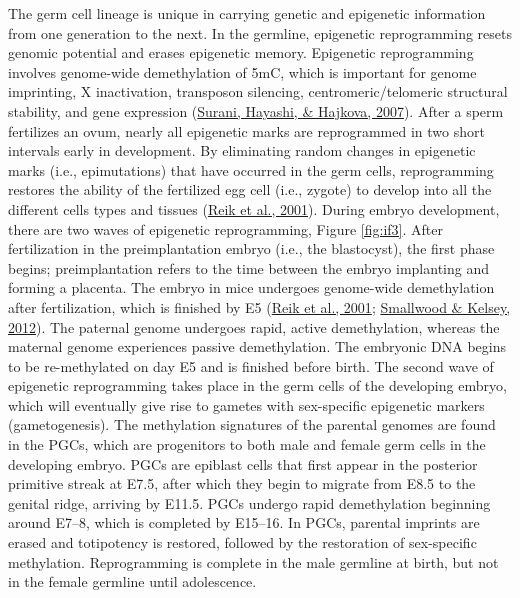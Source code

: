 \documentclass[12pt,twoside]{reedthesis}
\begin{document}
The germ cell lineage is unique in carrying genetic and epigenetic
information from one generation to the next. In the germline, epigenetic
reprogramming resets genomic potential and erases epigenetic memory.
Epigenetic reprogramming involves genome-wide demethylation of 5mC,
which is important for genome imprinting, X inactivation, transposon
silencing, centromeric/telomeric structural stability, and gene
expression (\protect\hyperlink{ref-surani2007}{Surani, Hayashi, \& Hajkova, 2007}). After a sperm fertilizes an ovum, nearly all
epigenetic marks are reprogrammed in two short intervals early in
development. By eliminating random changes in epigenetic marks (i.e.,
epimutations) that have occurred in the germ cells, reprogramming restores the ability
of the fertilized egg cell (i.e., zygote) to develop into all the
different cells types and tissues (\protect\hyperlink{ref-reik2001}{Reik et al., 2001}). During embryo
development, there are two waves of epigenetic reprogramming, Figure \ref{fig:if3}.
After fertilization in the preimplantation embryo (i.e., the
blastocyst), the first phase begins; preimplantation refers to the time
between the embryo implanting and forming a placenta. The embryo in mice
undergoes genome-wide demethylation after fertilization, which is
finished by E5 (\protect\hyperlink{ref-reik2001}{Reik et al., 2001}; \protect\hyperlink{ref-smallwood2012}{Smallwood \& Kelsey, 2012}). The
paternal genome undergoes rapid, active demethylation, whereas the
maternal genome experiences passive demethylation. The embryonic DNA
begins to be re-methylated on day E5 and is finished before birth. The
second wave of epigenetic reprogramming takes place in the germ cells of
the developing embryo, which will eventually give rise to gametes with
sex-specific epigenetic markers (gametogenesis). The methylation
signatures of the parental genomes are found in the PGCs, which are progenitors to both male and female germ cells
in the developing embryo. PGCs are epiblast cells that first appear in
the posterior primitive streak at E7.5, after which they begin to
migrate from E8.5 to the genital ridge, arriving by E11.5. PGCs undergo
rapid demethylation beginning around E7--8, which is completed by
E15--16. In PGCs, parental imprints are erased and totipotency is
restored, followed by the restoration of sex-specific methylation.
Reprogramming is complete in the male germline at birth, but not in the
female germline until adolescence.
\end{document}
